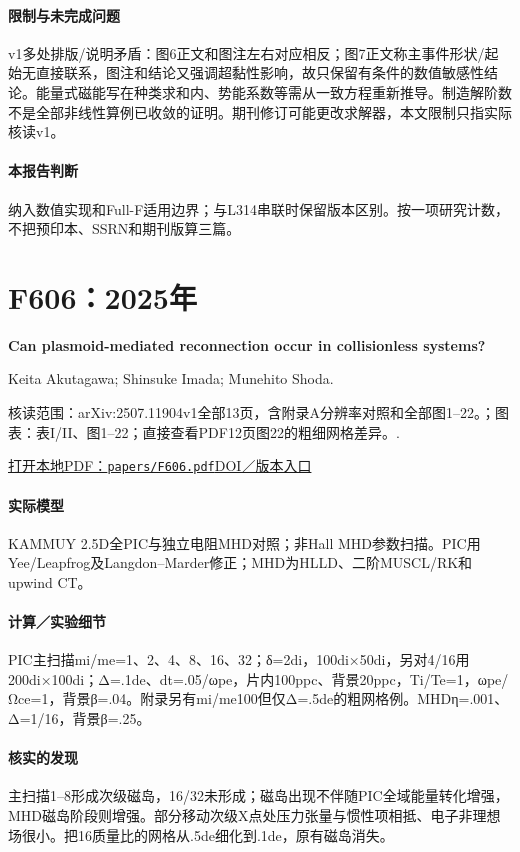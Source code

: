 \paragraph{限制与未完成问题}v1多处排版/说明矛盾：图6正文和图注左右对应相反；图7正文称主事件形状/起始无直接联系，图注和结论又强调超黏性影响，故只保留有条件的数值敏感性结论。能量式磁能写在种类求和内、势能系数等需从一致方程重新推导。制造解阶数不是全部非线性算例已收敛的证明。期刊修订可能更改求解器，本文限制只指实际核读v1。

\paragraph{本报告判断}纳入数值实现和Full-F适用边界；与L314串联时保留版本区别。按一项研究计数，不把预印本、SSRN和期刊版算三篇。

\section{F606：2025年}\label{paper:F606}

\textbf{Can plasmoid-mediated reconnection occur in collisionless systems?}\citep{F606}\

Keita Akutagawa;  Shinsuke Imada;  Munehito Shoda.

\textsf{核读范围：}arXiv:2507.11904v1全部13页，含附录A分辨率对照和全部图1–22。；\textsf{图表：}表I/II、图1–22；直接查看PDF12页图22的粗细网格差异。.

\href{run:papers/F606.pdf}{打开本地PDF：\texttt{papers/F606.pdf}}\quad\href{https://doi.org/10.1063/5.0274477}{DOI／版本入口}

\paragraph{实际模型}KAMMUY 2.5D全PIC与独立电阻MHD对照；非Hall MHD参数扫描。PIC用Yee/Leapfrog及Langdon–Marder修正；MHD为HLLD、二阶MUSCL/RK和upwind CT。

\paragraph{计算／实验细节}PIC主扫描mi/me=1、2、4、8、16、32；δ=2di，100di×50di，另对4/16用200di×100di；Δ=.1de、dt=.05/ωpe，片内100ppc、背景20ppc，Ti/Te=1，ωpe/Ωce=1，背景β=.04。附录另有mi/me100但仅Δ=.5de的粗网格例。MHDη=.001、Δ=1/16，背景β=.25。

\paragraph{核实的发现}主扫描1–8形成次级磁岛，16/32未形成；磁岛出现不伴随PIC全域能量转化增强，MHD磁岛阶段则增强。部分移动次级X点处压力张量与惯性项相抵、电子非理想场很小。把16质量比的网格从.5de细化到.1de，原有磁岛消失。

